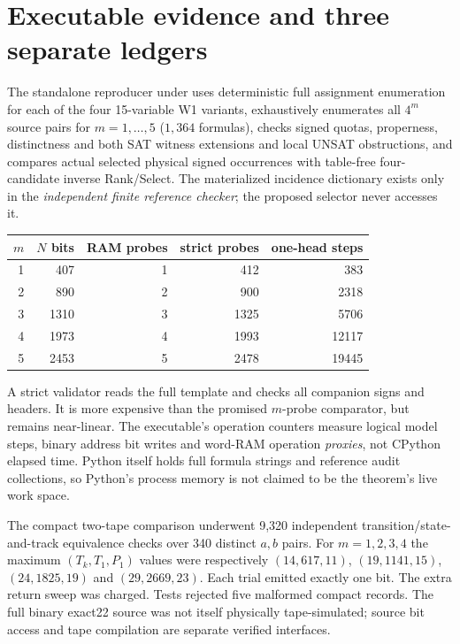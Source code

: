 \documentclass[11pt]{article}
\begin{document}
\section{Executable evidence and three separate ledgers}
The standalone reproducer under
uses deterministic full assignment enumeration for each of the four
15-variable W1 variants, exhaustively enumerates all $4^m$ source
pairs for $m=1,\ldots,5$ ($1{,}364$ formulas), checks signed quotas,
properness, distinctness and both SAT witness extensions and local UNSAT
obstructions, and compares actual selected physical signed
occurrences with table-free four-candidate inverse Rank/Select.
The materialized incidence dictionary exists only in the
\emph{independent finite reference checker}; the proposed selector
never accesses it.

\begin{center}\small
\begin{tabular}{rrrrr}
\toprule
$m$ & $N$ bits & RAM probes & strict probes & one-head steps\\
\midrule
1&407&1&412&383\\
2&890&2&900&2318\\
3&1310&3&1325&5706\\
4&1973&4&1993&12117\\
5&2453&5&2478&19445\\
\bottomrule
\end{tabular}
\end{center}
A strict validator reads the full template and checks all companion
signs and headers. It is more expensive than the promised $m$-probe
comparator, but remains near-linear. The executable's operation counters
measure logical model steps, binary address bit writes and word-RAM
operation \emph{proxies}, not CPython elapsed time. Python itself
holds full formula strings and reference audit collections, so Python's
process memory is not claimed to be the theorem's live work space.

The compact two-tape comparison underwent 9,320 independent
transition/state-and-track equivalence checks over 340 distinct
$a,b$ pairs. For $m=1,2,3,4$ the maximum
$(T_k,T_1,P_1)$ values were respectively
$(14,617,11)$, $(19,1141,15)$, $(24,1825,19)$ and
$(29,2669,23)$. Each trial emitted exactly one bit.
The extra return sweep was charged. Tests rejected five malformed
compact records. The full binary exact22 source was not itself
physically tape-simulated; source bit access and tape compilation
are separate verified interfaces.
\end{document}
